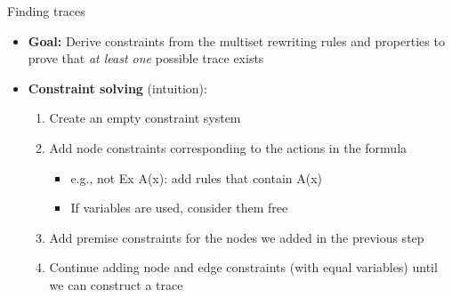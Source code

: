 \documentclass[11pt,aspectratio=169]{beamer}
\begin{document}
\begin{frame}[fragile]{Finding traces}
    \begin{itemize}
        \item \textbf{Goal:} Derive constraints from the multiset rewriting 
              rules and properties to prove that \textit{at least one} possible 
              trace exists
        \item \textbf{Constraint solving} (intuition):
        \begin{enumerate}
            \item Create an empty constraint system
            \item Add node constraints corresponding to the actions in the 
                  formula
            \begin{itemize}
                \item e.g., not Ex A(x): add rules that contain A(x)
                \item If variables are used, consider them free
            \end{itemize}
            \item Add premise constraints for the nodes we added in the 
                  previous step
            \item Continue adding node and edge constraints (with equal 
                  variables) until we can construct a trace
        \end{enumerate}
    \end{itemize}
\end{frame}
\end{document}
